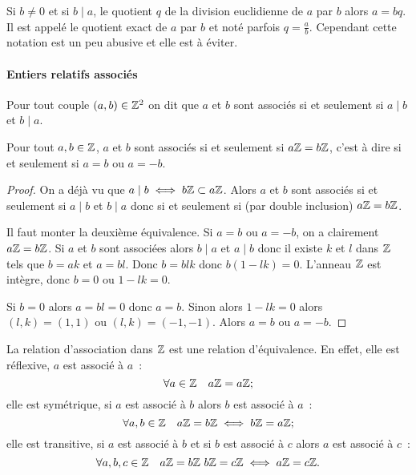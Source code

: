 Si \(b \neq 0\) et si \(b\mid a\), le quotient \(q\) de la division euclidienne
de \(a\) par \(b\) alors \(a=bq\). Il est appelé le quotient exact de \(a\) par
\(b\) et noté parfois \(q=\frac{a}{b}\). Cependant cette notation est un peu
abusive et elle est à éviter.

\paragraph{Entiers relatifs associés}

\begin{defdef}
  Pour tout couple \((a,b) \in \mathbb{Z}^2\) on dit que \(a\) et \(b\) sont associés si
  et seulement si \(a\mid b\) et \(b\mid a\).
\end{defdef}
\begin{prop}
  Pour tout \(a,b \in \mathbb{Z}\), \(a\) et \(b\) sont associés si et seulement si
  \(a\mathbb{Z}=b\mathbb{Z}\), c'est à dire si et seulement si \(a=b\) ou \(a=-b\).
\end{prop}
\begin{proof}
  On a déjà vu que \(a\mid b \iff b\mathbb{Z} \subset a\mathbb{Z}\). Alors \(a\) et \(b\) sont
  associés si et seulement si \(a\mid b\) et \(b\mid a\) donc si et seulement si
  (par double inclusion) \(a\mathbb{Z}=b\mathbb{Z}\).

  Il faut monter la deuxième équivalence. Si \(a=b\) ou \(a=-b\), on a
  clairement \(a\mathbb{Z}=b\mathbb{Z}\). Si \(a\) et \(b\) sont associées alors \(b\mid a\) et
  \(a\mid b\) donc il existe \(k\) et \(l\) dans \(\mathbb{Z}\) tels que \(b=ak\) et
  \(a=bl\). Donc \(b=blk\) donc \(b(1-lk)=0\). L'anneau \(\mathbb{Z}\) est intègre, donc
  \(b=0\) ou \(1-lk=0\).

  Si \(b=0\) alors \(a=bl=0\) donc \(a=b\). Sinon alors \(1-lk=0\) alors
  \((l,k)=(1,1)\) ou \((l,k)=(-1,-1)\). Alors \(a=b\) ou \(a=-b\).
\end{proof}

La relation d'association dans \(\mathbb{Z}\) est une relation d'équivalence. En effet,
elle est réflexive, \(a\) est associé à \(a\)~:
\begin{equation}
  \forall a \in \mathbb{Z} \quad a\mathbb{Z}=a\mathbb{Z};
\end{equation}
elle est symétrique, si \(a\) est associé à \(b\) alors \(b\) est associé à
\(a\)~:
\begin{equation}
  \forall a,b \in \mathbb{Z} \quad a\mathbb{Z}=b\mathbb{Z} \iff b\mathbb{Z}=a\mathbb{Z};
\end{equation}
elle est transitive, si \(a\) est associé à \(b\) et si \(b\) est associé à
\(c\) alors \(a\) est associé à \(c\)~:
\begin{equation}
  \forall a,b,c \in \Z \quad a\Z=b\Z \ b\Z=c\Z \iff a\Z=c\Z.
\end{equation}

